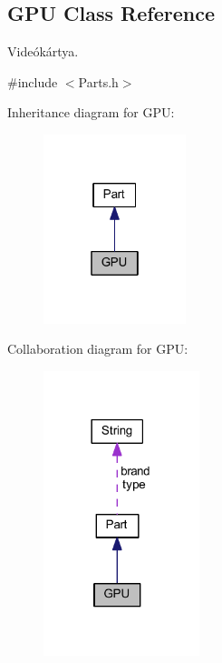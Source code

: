 \hypertarget{class_g_p_u}{}\subsection{G\+PU Class Reference}
\label{class_g_p_u}


Videókártya.  




{\ttfamily \#include $<$Parts.\+h$>$}



Inheritance diagram for G\+PU\+:
\nopagebreak
\begin{figure}[H]
\begin{center}
\leavevmode
\includegraphics[width=118pt]{class_g_p_u__inherit__graph}
\end{center}
\end{figure}


Collaboration diagram for G\+PU\+:
\nopagebreak
\begin{figure}[H]
\begin{center}
\leavevmode
\includegraphics[width=129pt]{class_g_p_u__coll__graph}
\end{center}
\end{figure}
